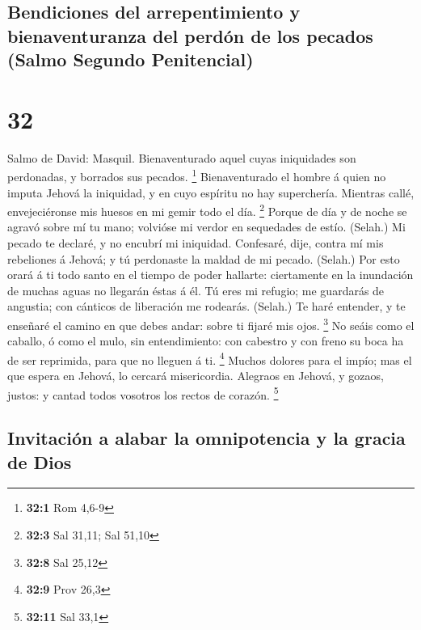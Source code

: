\hypertarget{bendiciones-del-arrepentimiento-y-bienaventuranza-del-perduxf3n-de-los-pecados-salmo-segundo-penitencial}{%
\subsection{Bendiciones del arrepentimiento y bienaventuranza del perdón
de los pecados (Salmo Segundo
Penitencial)}\label{bendiciones-del-arrepentimiento-y-bienaventuranza-del-perduxf3n-de-los-pecados-salmo-segundo-penitencial}}

\hypertarget{section-31}{%
\section{32}\label{section-31}}

 Salmo de David: Masquil. Bienaventurado aquel cuyas
iniquidades son perdonadas, y borrados sus pecados. \footnote{\textbf{32:1}
  Rom 4,6-9}  Bienaventurado el hombre á quien no imputa
Jehová la iniquidad, y en cuyo espíritu no hay superchería. 
Mientras callé, envejeciéronse mis huesos en mi gemir todo el día.
\footnote{\textbf{32:3} Sal 31,11; Sal 51,10}  Porque de día
y de noche se agravó sobre mí tu mano; volvióse mi verdor en sequedades
de estío. (Selah.)  Mi pecado te declaré, y no encubrí mi
iniquidad. Confesaré, dije, contra mí mis rebeliones á Jehová; y tú
perdonaste la maldad de mi pecado. (Selah.)  Por esto orará
á ti todo santo en el tiempo de poder hallarte: ciertamente en la
inundación de muchas aguas no llegarán éstas á él.  Tú eres
mi refugio; me guardarás de angustia; con cánticos de liberación me
rodearás. (Selah.)  Te haré entender, y te enseñaré el
camino en que debes andar: sobre ti fijaré mis ojos. \footnote{\textbf{32:8}
  Sal 25,12}  No seáis como el caballo, ó como el mulo, sin
entendimiento: con cabestro y con freno su boca ha de ser reprimida,
para que no lleguen á ti. \footnote{\textbf{32:9} Prov 26,3}
 Muchos dolores para el impío; mas el que espera en Jehová,
lo cercará misericordia.  Alegraos en Jehová, y gozaos,
justos: y cantad todos vosotros los rectos de corazón. \footnote{\textbf{32:11}
  Sal 33,1}

\hypertarget{invitaciuxf3n-a-alabar-la-omnipotencia-y-la-gracia-de-dios}{%
\subsection{Invitación a alabar la omnipotencia y la gracia de
Dios}\label{invitaciuxf3n-a-alabar-la-omnipotencia-y-la-gracia-de-dios}}

